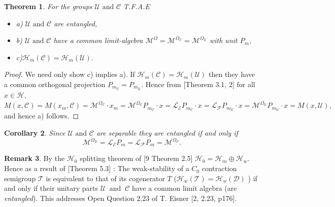 \documentclass[req no]{amsart}[16pt]
\theoremstyle{plain}
\newtheorem{theorem}{Theorem}[section]
\newtheorem{cor}[theorem]{Corollary}
\theoremstyle{definition}
\newtheorem{remark}[theorem]{Remark}
\numberwithin{equation}{section}\setcounter{page}{1}
\def\m{\mbox}
\def\D{\displaystyle}
\def\ma{\m{ and }}
\def\O{\Omega}
\def\D{\mathcal{D}}
\def\h{\mathcal{H}}
\def\T {\mathcal{T}}
\def\E {\mathcal{E}}
\def\L {\mathcal{L}}
\def\M {\mathcal{M}}
\def\F {\mathcal{F}}
\def\C{\mathcal{C}}
\def\U{\mathcal{U}}
\begin{document}
\begin{theorem} For the groups $\U \ma \C$ T.F.A.E
\begin{itemize}
  \item a) $\U \ma \C$ are \emph{entangled},
  \item b) $\U \ma \C$ have a common \emph{limit-algebra} $\M^{\Omega}=\M^{\Omega_{\C}}=\M^{\Omega_{\U}}$ with unit $P_{m}$,
  \item c)$\h_{m}(\mathcal{C})=\h_{m}(\mathcal{U})$.
\end{itemize}
\end {theorem}
\begin{proof} We need only show c) implies a). If $\h_{m}(\mathcal{C})=\h_{m}(\mathcal{U})$ then they have a common orthogonal projection $P_{m_{\C}} = P_{m_{\U}}$. Hence from [Theorem 3.1, 2] for all $x \in \h$, $$M(x, \C)= M(x_{m}, \C)= \M^{\O_{\C}}\cdot x_{m} = \M ^{\overline{\O_{\C}}}P_{m_{\C}}\cdot x = \overline{\L_{\E}}P_{m_{\C}}\cdot x = \overline{\L_{\F}}P_{m_{\U}}\cdot x= \M ^{\overline{\O_{\U}}}P_{m_{\U}}\cdot x = M(x,\U),$$
and hence a) follows.
\end{proof}


\begin{cor}
Since $\U \ma \C$ are separable they are \emph{entangled} if and only if  $$ \M^{\O_{\U}} =\L_{\E}P_{m} = \L_{\F}P_{m} =\M^{\O_{\C}}.$$
\end{cor}

\begin{remark}
  By the $\h_{0}$ splitting theorem of [9 Theorem 2.5] $\h_{0}= \h_{m} \oplus \h_w$. Hence as a result of  [Theorem 5.3] : The weak-stability of a $C_{0}$ contraction semigroup $\T$ is equivalent to that of its cogenerator $T$ ($\h_w(\T) = \h_w(\D)$ ) if and only if their unitary parts $\U ~ \ma ~\C$ have a common limit algebra (are \emph{entangled}). This addresses Open Question 2.23 of T. Eisner [2, 2.23, p176].
\end{remark}
\end{document}

